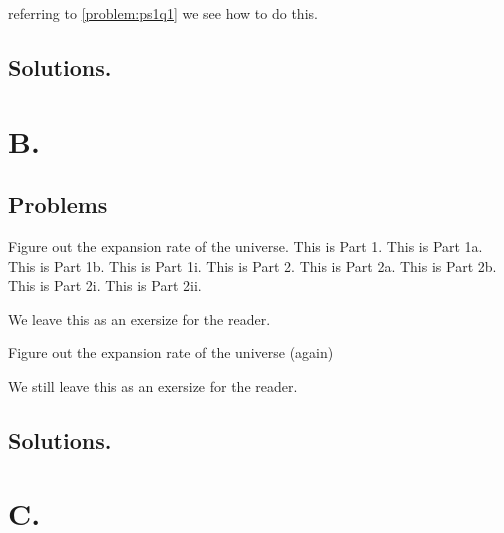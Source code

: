 referring to \ref{problem:ps1q1} we see how to do this.

\subsection{Solutions.}

\shipoutAnswer

\section{B.}

\subsection{Problems}

\begin{Exercise}[title={gravity},label={problem:gr1}]
\ExePart*[name={Preliminary}]
Figure out the expansion rate of the universe.
\Question[title={foo}]
This is Part 1.
\subQuestion[title={bar}]
This is Part 1a.
\subQuestion[]
This is Part 1b.
\subsubQuestion[title={foobar}]
This is Part 1i.
\Question[title={2foo}]
This is Part 2.
\subQuestion[title={2bar}]
This is Part 2a.
\subQuestion[]
This is Part 2b.
\subsubQuestion[title={2foobar}]
This is Part 2i.
\subsubQuestion[]
This is Part 2ii.
\end{Exercise}

\begin{Answer}[ref={problem:gr1}]
We leave this as an exersize for the reader.
\end{Answer}
\begin{Exercise}[title={gravity 2},label={problem:gr2}]
Figure out the expansion rate of the universe (again)
\end{Exercise}

\begin{Answer}[ref={problem:gr2}]
We still leave this as an exersize for the reader.
\end{Answer}

\subsection{Solutions.}

\shipoutAnswer

\section{C.}

